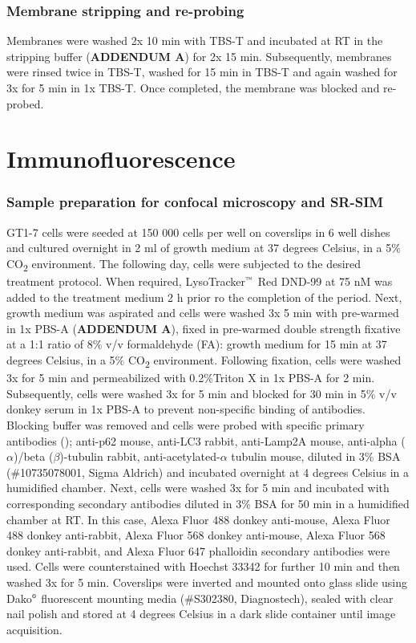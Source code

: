 \subsubsection{Membrane stripping and re-probing}
Membranes were washed 2x 10 min with TBS-T and incubated at RT in the stripping buffer (\textbf{ADDENDUM A}) for 2x 15 min. Subsequently, membranes were rinsed twice in TBS-T, washed for 15 min in TBS-T and again washed for 3x for 5 min in 1x TBS-T. Once completed, the membrane was blocked and re-probed.

\section{Immunofluorescence}
\subsubsection{Sample preparation for confocal microscopy and SR-SIM}
GT1-7 cells were seeded at 150 000 cells per well on coverslips in 6 well dishes and cultured overnight in 2 ml of growth medium at 37 degrees Celsius, in a 5\% CO\textsubscript{2} environment. The following day, cells were subjected to the desired treatment protocol. When required, LysoTracker${\textsuperscript{\tiny{\texttrademark}}}$ Red DND-99 at 75 nM was added to the treatment medium 2 h prior ro the completion of the period. Next, growth medium was aspirated and cells were washed 3x 5 min with pre-warmed in 1x PBS-A (\textbf{ADDENDUM A}), fixed in pre-warmed double strength fixative at a 1:1 ratio of 8\% v/v formaldehyde (FA): growth medium for 15 min at 37 degrees Celsius, in a 5\% CO\textsubscript{2} environment. Following fixation, cells were washed 3x for 5 min and permeabilized with 0.2\%Triton X in 1x PBS-A for 2 min. Subsequently, cells were washed 3x for 5 min and blocked for 30 min in 5\% v/v donkey serum in 1x PBS-A to prevent non-specific binding of antibodies. Blocking buffer was removed and cells were probed with specific primary antibodies (); anti-p62 mouse, anti-LC3 rabbit, anti-Lamp2A mouse, anti-alpha ($\alpha$)/beta ($\beta$)-tubulin rabbit, anti-acetylated-$\alpha$ tubulin mouse, diluted in 3\% BSA (\#10735078001, Sigma Aldrich) and incubated overnight at 4 degrees Celsius in a humidified chamber. Next, cells were washed 3x for 5 min and incubated with corresponding secondary antibodies diluted in 3\% BSA for 50 min in a humidified chamber at RT. In this case, Alexa Fluor 488 donkey anti-mouse, Alexa Fluor 488 donkey anti-rabbit, Alexa Fluor 568 donkey anti-mouse, Alexa Fluor 568 donkey anti-rabbit, and Alexa Fluor 647 phalloidin secondary antibodies were used. Cells were counterstained with Hoechst 33342 for further 10 min and then washed 3x for 5 min. Coverslips were inverted and mounted onto glass slide using Dako${\textsuperscript{\tiny{\textregistered}}}$ fluorescent mounting media (\#S302380, Diagnostech), sealed with clear nail polish and stored at 4 degrees Celsius in a dark slide container until image acquisition.


